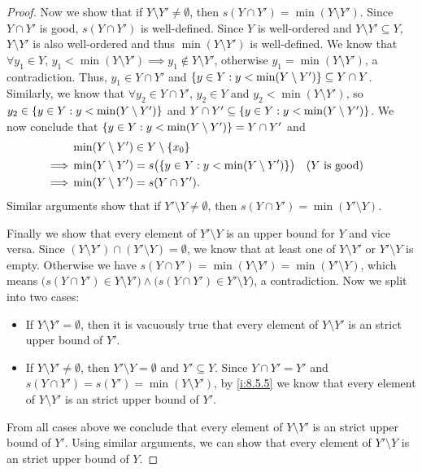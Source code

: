 \begin{proof}
  Now we show that if \(Y \setminus Y' \neq \emptyset\), then \(s(Y \cap Y') = \min(Y \setminus Y')\).
  Since \(Y \cap Y'\) is good, \(s(Y \cap Y')\) is well-defined.
  Since \(Y\) is well-ordered and \(Y \setminus Y' \subseteq Y\), \(Y \setminus Y'\) is also well-ordered and thus \(\min(Y \setminus Y')\) is well-defined.
  We know that \(\forall y_1 \in Y\), \(y_1 < \min(Y \setminus Y') \implies y_1 \notin Y \setminus Y'\), otherwise \(y_1 = \min(Y \setminus Y')\), a contradiction.
  Thus, \(y_1 \in Y \cap Y'\) and \(\left\lbrace y \in Y : y < \min(Y \setminus Y')\right\rbrace \subseteq Y \cap Y\).
  Similarly, we know that \(\forall y_2 \in Y \cap Y'\), \(y_2 \in Y\) and \(y_2 < \min(Y \setminus Y')\), so \(y_2 \in \left\lbrace y \in Y : y < \min(Y \setminus Y')\right\rbrace\) and \(Y \cap Y' \subseteq \left\lbrace y \in Y : y < \min(Y \setminus Y')\right\rbrace\).
  We now conclude that \(\left\lbrace y \in Y : y < \min(Y \setminus Y')\right\rbrace = Y \cap Y'\) and
  \begin{align*}
             & \min(Y \setminus Y') \in Y \setminus \set{x_0}                                                         \\
    \implies & \min(Y \setminus Y') = s\big(\set{y \in Y : y < \min(Y \setminus Y')}\big) &  & \text{(\(Y\) is good)} \\
    \implies & \min(Y \setminus Y') = s(Y \cap Y').
  \end{align*}
  Similar arguments show that if \(Y' \setminus Y \neq \emptyset\), then \(s(Y \cap Y') = \min(Y' \setminus Y)\).

  Finally we show that every element of \(Y' \setminus Y\) is an upper bound for \(Y\) and vice versa.
  Since \((Y \setminus Y') \cap (Y' \setminus Y) = \emptyset\), we know that at least one of \(Y \setminus Y'\) or \(Y' \setminus Y\) is empty.
  Otherwise we have \(s(Y \cap Y') = \min(Y \setminus Y') = \min(Y' \setminus Y)\), which means \(\big(s(Y \cap Y') \in Y \setminus Y'\big) \land \big(s(Y \cap Y') \in Y' \setminus Y\big)\), a contradiction.
  Now we split into two cases:
  \begin{itemize}
    \item If \(Y \setminus Y' = \emptyset\), then it is vacuously true that every element of \(Y \setminus Y'\) is an strict upper bound of \(Y'\).
    \item If \(Y \setminus Y' \neq \emptyset\), then \(Y' \setminus Y = \emptyset\) and \(Y' \subseteq Y\).
          Since \(Y \cap Y' = Y'\) and \(s(Y \cap Y') = s(Y') = \min(Y \setminus Y')\), by \cref{i:8.5.5} we know that every element of \(Y \setminus Y'\) is an strict upper bound of \(Y'\).
  \end{itemize}
  From all cases above we conclude that every element of \(Y \setminus Y'\) is an strict upper bound of \(Y'\).
  Using similar arguments, we can show that every element of \(Y' \setminus Y\) is an strict upper bound of \(Y\).
\end{proof}

